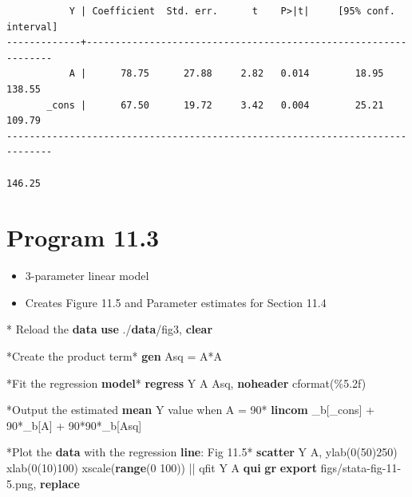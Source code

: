 \documentclass[
  10pt,
]{book}
\newenvironment{Shaded}{\begin{snugshade}}{\end{snugshade}}
\newcommand{\BaseNTok}[1]{\textcolor[rgb]{0.00,0.00,0.81}{#1}}
\newcommand{\DataTypeTok}[1]{\textcolor[rgb]{0.13,0.29,0.53}{#1}}
\newcommand{\KeywordTok}[1]{\textcolor[rgb]{0.13,0.29,0.53}{\textbf{#1}}}
\newcommand{\NormalTok}[1]{#1}
\newcommand{\OtherTok}[1]{\textcolor[rgb]{0.56,0.35,0.01}{#1}}
\providecommand{\tightlist}{%
  \setlength{\itemsep}{0pt}\setlength{\parskip}{0pt}}
\begin{document}
\begin{verbatim}
           Y | Coefficient  Std. err.      t    P>|t|     [95% conf. interval]
-------------+----------------------------------------------------------------
           A |      78.75      27.88     2.82   0.014        18.95      138.55
       _cons |      67.50      19.72     3.42   0.004        25.21      109.79
------------------------------------------------------------------------------

146.25
\end{verbatim}

\hypertarget{program-11.3-1}{%
\section{Program 11.3}\label{program-11.3-1}}

\begin{itemize}
\tightlist
\item
  3-parameter linear model
\item
  Creates Figure 11.5 and Parameter estimates for Section 11.4
\end{itemize}

\begin{Shaded}
\begin{Highlighting}[]
\NormalTok{* Reload the }\KeywordTok{data}
\KeywordTok{use}\NormalTok{ ./}\KeywordTok{data}\NormalTok{/fig3, }\KeywordTok{clear}

\NormalTok{*Create the product term*}
\KeywordTok{gen}\NormalTok{ Asq = A*A}

\NormalTok{*Fit the regression }\KeywordTok{model}\NormalTok{*}
\KeywordTok{regress}\NormalTok{ Y A Asq, }\KeywordTok{noheader}\NormalTok{ cformat(\%5.2f)}

\NormalTok{*Output the estimated }\KeywordTok{mean}\NormalTok{ Y }\OtherTok{value}\NormalTok{ when A = 90*}
\KeywordTok{lincom}\NormalTok{ \_b[}\DataTypeTok{\_cons}\NormalTok{] + 90*\_b[A] + 90*90*\_b[Asq]}

\NormalTok{*Plot the }\KeywordTok{data}\NormalTok{ with the regression }\KeywordTok{line}\NormalTok{: Fig 11.5*}
\KeywordTok{scatter}\NormalTok{ Y A, ylab(0(50)250) xlab(0(10)100) }\BaseNTok{xscale}\NormalTok{(}\KeywordTok{range}\NormalTok{(0 100)) || qfit Y A}
\KeywordTok{qui} \KeywordTok{gr} \KeywordTok{export}\NormalTok{ figs/stata{-}fig{-}11{-}5.png, }\KeywordTok{replace}
\end{Highlighting}
\end{Shaded}
\end{document}
